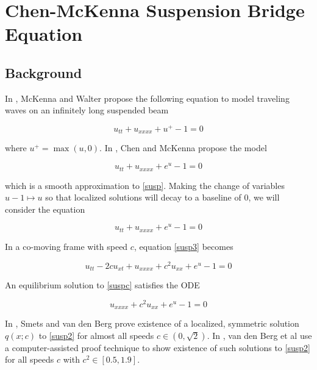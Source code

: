 \documentclass[12pt]{article}
\begin{document}
\section{Chen-McKenna Suspension Bridge Equation}

\subsection{Background}

In \cite{McKenna1990}, McKenna and Walter propose the following equation to model traveling waves on an infinitely long suspended beam

\begin{equation}\label{susp}
u_{tt} + u_{xxxx} + u^+ - 1 = 0
\end{equation}

where $u^+ = \max(u, 0)$. In \cite{Chen1997}, Chen and McKenna propose the model

\begin{equation}\label{susp2}
u_{tt} + u_{xxxx} + e^{u} - 1 = 0
\end{equation}

which is a smooth approximation to \eqref{susp}. Making the change of variables $u - 1 \mapsto u$ so that localized solutions will decay to a baseline of 0, we will consider the equation

\begin{equation}\label{susp3}
u_{tt} + u_{xxxx} + e^{u} - 1 = 0
\end{equation}

In a co-moving frame with speed $c$, equation \eqref{susp3} becomes

\begin{equation}\label{suspc}
u_{tt} - 2 c u_{x t} + u_{xxxx} + c^2 u_{xx} + e^{u} - 1 = 0
\end{equation}

An equilibrium solution to \eqref{suspc} satisfies the ODE

\begin{equation}\label{eqODE}
u_{xxxx} + c^2 u_{xx} + e^{u} - 1 = 0
\end{equation}

In \cite[Theorem 11]{Smets2002}, Smets and van den Berg prove existence of a localized, symmetric solution $q(x; c)$ to \eqref{susp2} for almost all speeds $c \in (0, \sqrt{2})$. In \cite[Theorem 1]{Berg2018}, van den Berg et al use a computer-assisted proof technique to show existence of such solutions to \eqref{susp2} for all speeds $c$ with $c^2 \in [0.5, 1.9]$.\\
\end{document}

